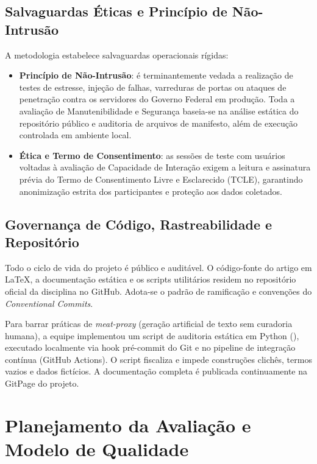 \documentclass[journal]{IEEEtran}
\begin{document}
\subsection{Salvaguardas Éticas e Princípio de Não-Intrusão}
\label{sec:eticas}

A metodologia estabelece salvaguardas operacionais rígidas:
\begin{itemize}
    \item \textbf{Princípio de Não-Intrusão}: é terminantemente vedada a realização de testes de estresse, injeção de falhas, varreduras de portas ou ataques de penetração contra os servidores do Governo Federal em produção. Toda a avaliação de Manutenibilidade e Segurança baseia-se na análise estática do repositório público e auditoria de arquivos de manifesto, além de execução controlada em ambiente local.
    \item \textbf{Ética e Termo de Consentimento}: as sessões de teste com usuários voltadas à avaliação de Capacidade de Interação exigem a leitura e assinatura prévia do Termo de Consentimento Livre e Esclarecido (TCLE), garantindo anonimização estrita dos participantes e proteção aos dados coletados.
\end{itemize}

\subsection{Governança de Código, Rastreabilidade e Repositório}
\label{sec:governanca}

Todo o ciclo de vida do projeto é público e auditável. O código-fonte do artigo em LaTeX, a documentação estática e os scripts utilitários residem no repositório oficial da disciplina no GitHub. Adota-se o padrão de ramificação  e convenções do \textit{Conventional Commits}. 

Para barrar práticas de \textit{meat-proxy} (geração artificial de texto sem curadoria humana), a equipe implementou um script de auditoria estática em Python (), executado localmente via hook pré-commit do Git e no pipeline de integração contínua (GitHub Actions). O script fiscaliza e impede construções clichês, termos vazios e dados fictícios. A documentação completa é publicada continuamente na GitPage do projeto.

\section{Planejamento da Avaliação e Modelo de Qualidade}
\label{sec:fase1}
\end{document}
